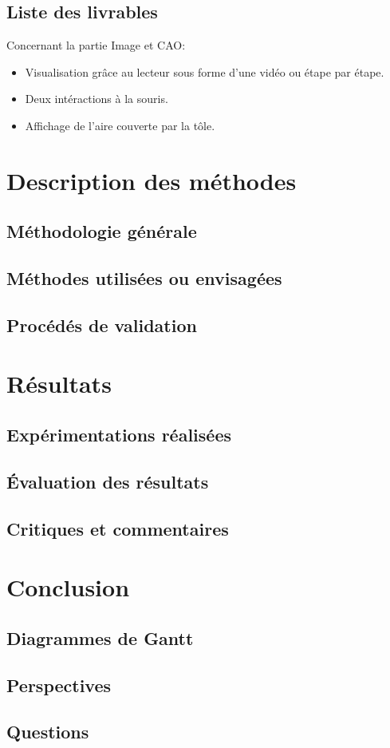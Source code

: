 \documentclass{beamer}
\begin{document}
\subsection{Liste des livrables}
\begin{frame}
    Concernant la partie Image et CAO:
    \begin{itemize}
        \item Visualisation grâce au lecteur sous forme d'une vidéo ou étape par étape.
        \item Deux intéractions à la souris.
        \item Affichage de l'aire couverte par la tôle.
    \end{itemize}
\end{frame}

\section{Description des méthodes}
\subsection{Méthodologie générale}
\subsection{Méthodes utilisées ou envisagées}
\subsection{Procédés de validation}

\section{Résultats}
\subsection{Expérimentations réalisées}
\subsection{Évaluation des résultats}
\subsection{Critiques et commentaires}

\section{Conclusion}
\subsection{Diagrammes de Gantt}
\subsection{Perspectives}
\subsection{Questions}
\end{document}
